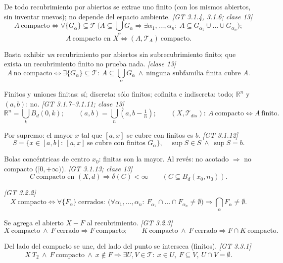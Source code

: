 \documentclass[11pt,a4paper]{article}
\theoremstyle{definition}
\theoremstyle{plain}
\newcommand{\fnt}[1]{{\normalfont\small\itshape\color{gray!150!black}[#1]}}
\newcommand{\R}{\mathbb{R}}
\newcommand{\Bola}[2]{B_d(#1,#2)}
\newcommand{\tp}{\mathcal{T}}
\begin{document}
\begin{itemize}[leftmargin=1.3em,itemsep=3pt]

 De todo recubrimiento por abiertos se extrae uno finito (con los mismos abiertos, sin inventar nuevos); no depende del espacio ambiente. \fnt{GT 3.1.4, 3.1.6; clase 13}
\[ A\ \text{compacto}\iff \forall\{G_\alpha\}\subseteq\tp\ \big(A\subseteq\textstyle\bigcup_\alpha G_\alpha\Rightarrow\exists\alpha_1,\dots,\alpha_n:\ A\subseteq G_{\alpha_1}\cup\dots\cup G_{\alpha_n}\big); \]
\[ A\ \text{compacto en } X\iff(A,\tp_A)\ \text{compacto}. \]

 Basta exhibir \emph{un} recubrimiento por abiertos sin subrecubrimiento finito; que exista un recubrimiento finito no prueba nada. \fnt{clase 13}
\[ A\ \text{no compacto}\iff\exists\{G_\alpha\}\subseteq\tp:\ A\subseteq\textstyle\bigcup_\alpha G_\alpha\ \wedge\ \text{ninguna subfamilia finita cubre } A. \]

 Finitos y uniones finitas: sí; discreta: sólo finitos; cofinita e indiscreta: todo; $\R^n$ y $(a,b)$: no. \fnt{GT 3.1.7--3.1.11; clase 13}
\[ \R^n=\textstyle\bigcup_k\Bola{0}{k};\qquad (a,b)=\bigcup_n(a,b-\tfrac1n);\qquad (X,\tp_{dis}):\ A\ \text{compacto}\iff A\ \text{finito}. \]

 Por supremo: el mayor $x$ tal que $[a,x]$ se cubre con finitos es $b$. \fnt{GT 3.1.12}
\[ S=\{x\in[a,b]:\ [a,x]\ \text{se cubre con finitos } G_\alpha\},\quad \sup S\in S\ \wedge\ \sup S=b. \]

 Bolas concéntricas de centro $x_0$: finitas son la mayor. Al revés: no acotado $\Rightarrow$ no compacto ($[0,+\infty)$). \fnt{GT 3.1.13; clase 13}
\[ C\ \text{compacto en } (X,d)\Rightarrow \delta(C)<\infty\qquad(C\subseteq\Bola{x_0}{n_0}). \]

 \fnt{GT 3.2.2}
\[ X\ \text{compacto}\iff \forall\{F_\alpha\}\ \text{cerrados}:\ \big(\forall\alpha_1,\dots,\alpha_n:\ F_{\alpha_1}\cap\dots\cap F_{\alpha_n}\ne\emptyset\big)\Rightarrow\textstyle\bigcap_\alpha F_\alpha\ne\emptyset. \]

 Se agrega el abierto $X-F$ al recubrimiento. \fnt{GT 3.2.3}
\[ X\ \text{compacto}\ \wedge\ F\ \text{cerrado}\Rightarrow F\ \text{compacto};\qquad K\ \text{compacto}\ \wedge\ F\ \text{cerrado}\Rightarrow F\cap K\ \text{compacto}. \]

 Del lado del compacto se une, del lado del punto se interseca (finitos). \fnt{GT 3.3.1}
\[ X\ T_2\ \wedge\ F\ \text{compacto}\ \wedge\ x\notin F\Rightarrow\exists U,V\in\tp:\ x\in U,\ F\subseteq V,\ U\cap V=\emptyset. \]


\end{itemize}
\end{document}
